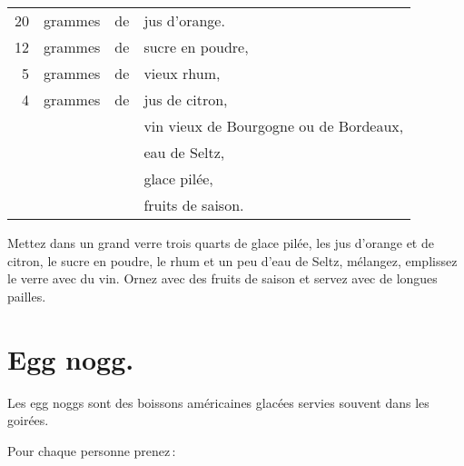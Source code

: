 \footnotesize
\begin{longtable}{rrrp{16em}}
     20 & grammes & de & jus d'orange.                                                                    \\
     12 & grammes & de & sucre en poudre,                                                                 \\
      5 & grammes & de & vieux rhum,                                                                      \\
      4 & grammes & de & jus de citron,                                                                   \\
        &         &    & vin vieux de Bourgogne ou de Bordeaux,                                           \\
        &         &    & eau de Seltz,                                                                    \\
        &         &    & glace pilée,                                                                     \\
        &         &    & fruits de saison.                                                                \\
\end{longtable}
\normalsize

Mettez dans un grand verre trois quarts de glace pilée, les jus d'orange et
de citron, le sucre en poudre, le rhum et un peu d’eau de Seltz, mélangez,
emplissez le verre avec du vin. Ornez avec des fruits de saison et servez avec
de longues pailles.

\section*{\centering Egg nogg.}
{}

Les egg noggs sont des boissons américaines glacées servies souvent dans les
goirées.

\medskip

Pour chaque personne prenez :

